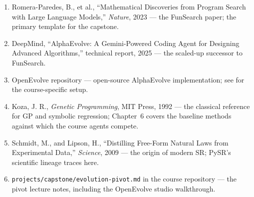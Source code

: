 \begin{small}
\begin{enumerate}
\item Romera-Paredes, B., et al., ``Mathematical Discoveries from Program Search with Large Language Models,'' \emph{Nature}, 2023 — the FunSearch paper; the primary template for the capstone.
\item DeepMind, ``AlphaEvolve: A Gemini-Powered Coding Agent for Designing Advanced Algorithms,'' technical report, 2025 — the scaled-up successor to FunSearch.
\item OpenEvolve repository — open-source AlphaEvolve implementation; see  for the course-specific setup.
\item Koza, J. R., \emph{Genetic Programming}, MIT Press, 1992 — the classical reference for GP and symbolic regression; Chapter~6 covers the baseline methods against which the course agents compete.
\item Schmidt, M., and Lipson, H., ``Distilling Free-Form Natural Laws from Experimental Data,'' \emph{Science}, 2009 — the origin of modern SR; PySR's scientific lineage traces here.
\item \texttt{projects/capstone/evolution-pivot.md} in the course repository — the pivot lecture notes, including the OpenEvolve studio walkthrough.
\end{enumerate}
\end{small}
